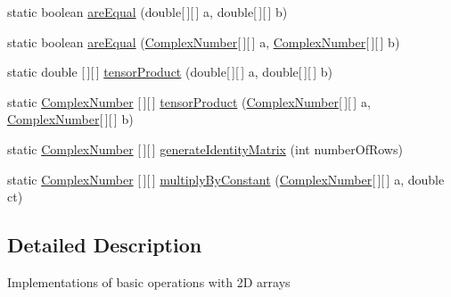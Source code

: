 \begin{DoxyCompactItemize}
\item 
static boolean \hyperlink{classcom_1_1ars_1_1quantum_1_1utils_1_1_matrix_operations_a04088b05f027b30f91558dba4a806f80}{are\+Equal} (double\mbox{[}$\,$\mbox{]}\mbox{[}$\,$\mbox{]} a, double\mbox{[}$\,$\mbox{]}\mbox{[}$\,$\mbox{]} b)
\item 
static boolean \hyperlink{classcom_1_1ars_1_1quantum_1_1utils_1_1_matrix_operations_a8b04e4621fe0c2496b5617d237d86baa}{are\+Equal} (\hyperlink{classcom_1_1ars_1_1complexnumbers_1_1_complex_number}{Complex\+Number}\mbox{[}$\,$\mbox{]}\mbox{[}$\,$\mbox{]} a, \hyperlink{classcom_1_1ars_1_1complexnumbers_1_1_complex_number}{Complex\+Number}\mbox{[}$\,$\mbox{]}\mbox{[}$\,$\mbox{]} b)
\item 
static double \mbox{[}$\,$\mbox{]}\mbox{[}$\,$\mbox{]} \hyperlink{classcom_1_1ars_1_1quantum_1_1utils_1_1_matrix_operations_ae32f245d0796d98e4a10e3f213ae621a}{tensor\+Product} (double\mbox{[}$\,$\mbox{]}\mbox{[}$\,$\mbox{]} a, double\mbox{[}$\,$\mbox{]}\mbox{[}$\,$\mbox{]} b)
\item 
static \hyperlink{classcom_1_1ars_1_1complexnumbers_1_1_complex_number}{Complex\+Number} \mbox{[}$\,$\mbox{]}\mbox{[}$\,$\mbox{]} \hyperlink{classcom_1_1ars_1_1quantum_1_1utils_1_1_matrix_operations_ab603ff7c94e923390ba21bbedbde64bf}{tensor\+Product} (\hyperlink{classcom_1_1ars_1_1complexnumbers_1_1_complex_number}{Complex\+Number}\mbox{[}$\,$\mbox{]}\mbox{[}$\,$\mbox{]} a, \hyperlink{classcom_1_1ars_1_1complexnumbers_1_1_complex_number}{Complex\+Number}\mbox{[}$\,$\mbox{]}\mbox{[}$\,$\mbox{]} b)
\item 
static \hyperlink{classcom_1_1ars_1_1complexnumbers_1_1_complex_number}{Complex\+Number} \mbox{[}$\,$\mbox{]}\mbox{[}$\,$\mbox{]} \hyperlink{classcom_1_1ars_1_1quantum_1_1utils_1_1_matrix_operations_a0f677528a5f918884277771667bf2133}{generate\+Identity\+Matrix} (int number\+Of\+Rows)
\item 
static \hyperlink{classcom_1_1ars_1_1complexnumbers_1_1_complex_number}{Complex\+Number} \mbox{[}$\,$\mbox{]}\mbox{[}$\,$\mbox{]} \hyperlink{classcom_1_1ars_1_1quantum_1_1utils_1_1_matrix_operations_ac7566a690e0c87a72548e69ea09c0158}{multiply\+By\+Constant} (\hyperlink{classcom_1_1ars_1_1complexnumbers_1_1_complex_number}{Complex\+Number}\mbox{[}$\,$\mbox{]}\mbox{[}$\,$\mbox{]} a, double ct)
\end{DoxyCompactItemize}


\subsection{Detailed Description}
Implementations of basic operations with 2D arrays 

